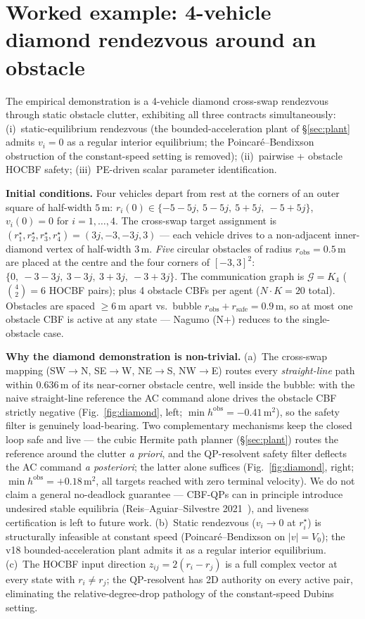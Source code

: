 \documentclass[letterpaper,10pt,conference]{IEEEtran}
\newcommand{\rsafe}{r_{\text{safe}}}
\begin{document}
\section{Worked example: 4-vehicle diamond rendezvous around an obstacle}
\label{sec:example}

The empirical demonstration is a 4-vehicle diamond cross-swap rendezvous through static obstacle clutter, exhibiting all three contracts simultaneously: (i)~static-equilibrium rendezvous (the bounded-acceleration plant of \S\ref{sec:plant} admits $v_i = 0$ as a regular interior equilibrium; the Poincar\'e--Bendixson obstruction of the constant-speed setting is removed); (ii)~pairwise + obstacle HOCBF safety; (iii)~PE-driven scalar parameter identification.

\textbf{Initial conditions.} Four vehicles depart from rest at the corners of an outer square of half-width $5$\,m: $r_i(0) \in \{-5-5j,\ 5-5j,\ 5+5j,\ -5+5j\}$, $v_i(0) = 0$ for $i=1,\dots,4$. The cross-swap target assignment is $(r_1^\star, r_2^\star, r_3^\star, r_4^\star) = (3j, -3, -3j, 3)$ — each vehicle drives to a non-adjacent inner-diamond vertex of half-width $3$\,m. \emph{Five} circular obstacles of radius $r_{\text{obs}} = 0.5$\,m are placed at the centre and the four corners of $[-3,3]^2$: $\{0,\ -3-3j,\ 3-3j,\ 3+3j,\ -3+3j\}$. The communication graph is $\mathcal{G} = K_4$ ($\binom{4}{2} = 6$ HOCBF pairs); plus 4 obstacle CBFs per agent ($N\cdot K = 20$ total). Obstacles are spaced $\ge 6$\,m apart vs.\ bubble $r_{\text{obs}} + \rsafe = 0.9$\,m, so at most one obstacle CBF is active at any state — Nagumo (N+) reduces to the single-obstacle case.

\textbf{Why the diamond demonstration is non-trivial.} (a)~The cross-swap mapping (SW$\to$N, SE$\to$W, NE$\to$S, NW$\to$E) routes every \emph{straight-line} path within $0.636$\,m of its near-corner obstacle centre, well inside the bubble: with the naive straight-line reference the AC command alone drives the obstacle CBF strictly negative (Fig.~\ref{fig:diamond}, left; $\min h^{\text{obs}} = -0.41$\,m$^2$), so the safety filter is genuinely load-bearing. Two complementary mechanisms keep the closed loop safe and live --- the cubic Hermite path planner (\S\ref{sec:plant}) routes the reference around the clutter \emph{a priori}, and the QP-resolvent safety filter deflects the AC command \emph{a posteriori}; the latter alone suffices (Fig.~\ref{fig:diamond}, right; $\min h^{\text{obs}} = +0.18$\,m$^2$, all targets reached with zero terminal velocity). We do not claim a general no-deadlock guarantee --- CBF-QPs can in principle introduce undesired stable equilibria (Reis--Aguiar--Silvestre 2021~\cite{reisAguiarSilvestre2021}), and liveness certification is left to future work. (b)~Static rendezvous ($v_i \to 0$ at $r_i^\star$) is structurally infeasible at constant speed (Poincar\'e--Bendixson on $|v|=V_0$); the v18 bounded-acceleration plant admits it as a regular interior equilibrium. (c)~The HOCBF input direction $z_{ij} = 2(r_i - r_j)$ is a full complex vector at every state with $r_i \ne r_j$; the QP-resolvent has 2D authority on every active pair, eliminating the relative-degree-drop pathology of the constant-speed Dubins setting.
\end{document}
